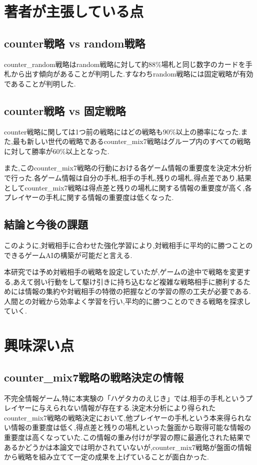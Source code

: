 \documentclass{jarticle}     %
\begin{document}
\section*{著者が主張している点}


\subsection*{counter戦略 vs random戦略}
counter\_random戦略はrandom戦略に対して約88\%場札と同じ数字のカードを手札から出す傾向があることが判明した.すなわちrandom戦略には固定戦略が有効であることが判明した.
\subsection*{counter戦略 vs 固定戦略}
counter戦略に関しては1つ前の戦略にはどの戦略も90\%以上の勝率になった.また,最も新しい世代の戦略であるcounter\_mix7戦略はグループ内のすべての戦略に対して勝率が60\%以上となった.\par
また,このcounter\_mix7戦略の行動における各ゲーム情報の重要度を決定木分析で行った.各ゲーム情報は自分の手札,相手の手札,残りの場札,得点差であり,結果としてcounter\_mix7戦略は得点差と残りの場札に関する情報の重要度が高く,各プレイヤーの手札に関する情報の重要度は低くなった.
\subsection*{結論と今後の課題}
\par
このように,対戦相手に合わせた強化学習により,対戦相手に平均的に勝つことのできるゲームAIの構築が可能だと言える.
\par
本研究では予め対戦相手の戦略を設定していたが,ゲームの途中で戦略を変更する,あえて弱い行動をして駆け引きに持ち込むなど複雑な戦略相手に勝利するためには情報の集約や対戦相手の特徴の把握などの学習の際の工夫が必要である.人間との対戦から効率よく学習を行い,平均的に勝つことのできる戦略を探求していく.

\section*{興味深い点}

\subsection*{counter\_mix7戦略の戦略決定の情報}
不完全情報ゲーム,特に本実験の「ハゲタカのえじき」では,相手の手札というプレイヤーに与えられない情報が存在する.決定木分析により得られたcounter\_mix7戦略の戦略決定において,他プレイヤーの手札という本来得られない情報の重要度は低く,得点差と残りの場札といった盤面から取得可能な情報の重要度は高くなっていた.この情報の重み付けが学習の際に最適化された結果であるかどうかは本論文では明かされていないが,counter\_mix7戦略が盤面の情報から戦略を組み立てて一定の成果を上げていることが面白かった.
\end{document}
